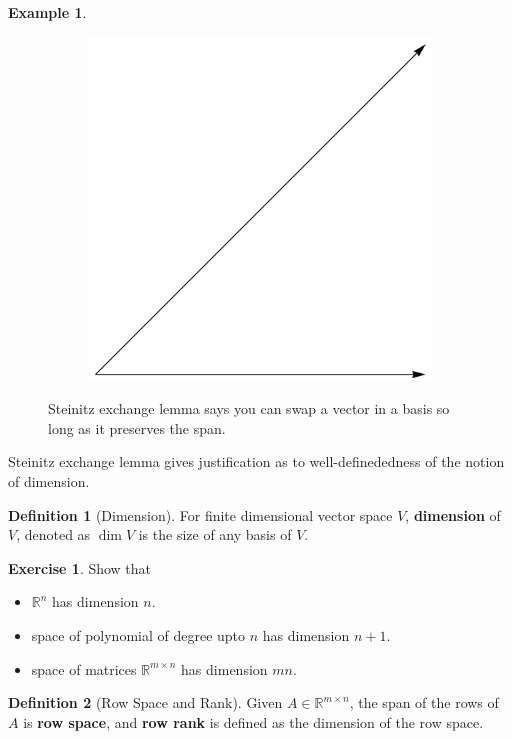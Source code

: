 \documentclass[12pt, a4paper]{article}
\newcommand{\R}{\mathbb{R}}
\theoremstyle{remark}
\theoremstyle{definition}
\newtheorem{definition}{Definition}
\newtheorem{example}{Example}
\newtheorem{exercise}{Exercise}
\numberwithin{equation}{section}
\numberwithin{definition}{section}
\numberwithin{example}{section}
\numberwithin{exercise}{section}
\numberwithin{remark}{section}
\numberwithin{figure}{section}
\begin{document}
\begin{example}
\begin{figure}[h]
\begin{subfigure}[b]{0.45\textwidth}
            \includegraphics[width=\textwidth]{Steinitz2}
        \end{subfigure}
        \caption{Steinitz exchange lemma says you can swap a vector in a basis so long as it preserves the span.}
        \label{fig: Steinitz Exchange Lemma}
    \end{figure}
\end{example}
Steinitz exchange lemma gives justification as to well-definededness of the notion of dimension.
\begin{definition}[Dimension]
    For finite dimensional vector space $V$,
    \textbf{dimension} of $V$, denoted as $\dim V$ is the size of any basis of $V$.
\end{definition}
\begin{exercise}
    Show that
    \begin{itemize}
        \item $\R^n$ has dimension $n$.
        \item space of polynomial of degree upto $n$ has dimension $n+1$.
        \item space of matrices $\R^{m \times n}$ has dimension $mn$.
    \end{itemize}
\end{exercise}
\begin{definition}[Row Space and Rank]
    Given $A \in \R^{m \times n}$, 
    the span of the rows of $A$ is \textbf{row space}, and
    \textbf{row rank} is defined as the dimension of the row space.
\end{definition}
\end{document}
